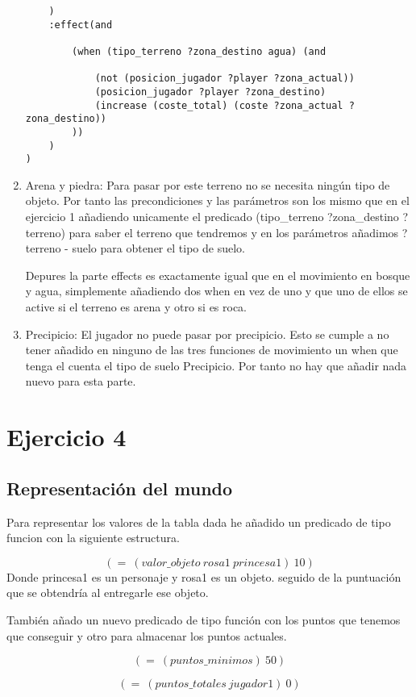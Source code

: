 \documentclass[]{article}
\begin{document}
\begin{enumerate}
\begin{lstlisting}
	)
	:effect(and 
		
		(when (tipo_terreno ?zona_destino agua) (and 
		
			(not (posicion_jugador ?player ?zona_actual))
			(posicion_jugador ?player ?zona_destino)
			(increase (coste_total) (coste ?zona_actual ?zona_destino))
		))
	)
)

\end{lstlisting}

\item{Arena y piedra:} Para pasar por este terreno no se necesita ningún tipo de objeto. Por tanto las precondiciones y las parámetros son los mismo que en el ejercicio 1 añadiendo unicamente el predicado (tipo\_terreno ?zona\_destino ?terreno) para saber el terreno que tendremos y en los parámetros añadimos ?terreno - suelo para obtener el tipo de suelo. 

Depures la parte effects es exactamente igual que en el movimiento en bosque y agua, simplemente añadiendo dos when en vez de uno y que uno de ellos se active si el terreno es arena y otro si es roca. 

\item{Precipicio:} El jugador no puede pasar por precipicio. Esto se cumple a no tener añadido en ninguno de las tres funciones de movimiento un when que tenga el cuenta el tipo de suelo Precipicio. Por tanto no hay que añadir nada nuevo para esta parte.

\end{enumerate}
\newpage
\section{Ejercicio 4}
\subsection{Representación del mundo}
Para representar los valores de la tabla dada he añadido un predicado de tipo funcion con la siguiente estructura.

$$
(=\ (valor\_objeto\ rosa1\ princesa1)\ 10)
$$
Donde princesa1 es un personaje y rosa1 es un objeto. seguido de la puntuación que se obtendría al entregarle ese objeto.

También añado un nuevo predicado de tipo función con los puntos que tenemos que conseguir y otro para almacenar los puntos actuales. 

$$
(=\ (puntos\_minimos)\ 50)
$$

$$
(=\ (puntos\_totales\ jugador1)\ 0)
$$
\end{document}
